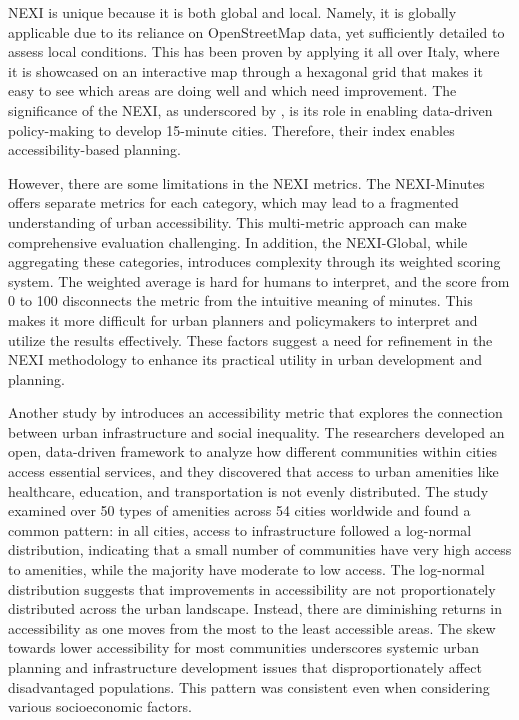 NEXI is unique because it is both global and local. 
Namely, it is globally applicable due to its reliance on OpenStreetMap data, yet sufficiently detailed to assess local conditions.
This has been proven by applying it all over Italy, where it is showcased on an interactive map through a hexagonal grid that makes it easy to see which areas are doing well and which need improvement.
The significance of the NEXI, as underscored by , is its role in enabling data-driven policy-making to develop 15-minute cities. 
Therefore, their index enables accessibility-based planning.

However, there are some limitations in the NEXI metrics. 
The NEXI-Minutes offers separate metrics for each category, which may lead to a fragmented understanding of urban accessibility. 
This multi-metric approach can make comprehensive evaluation challenging. 
In addition, the NEXI-Global, while aggregating these categories, introduces complexity through its weighted scoring system. 
The weighted average is hard for humans to interpret, and the score from 0 to 100 disconnects the metric from the intuitive meaning of minutes.
This makes it more difficult for urban planners and policymakers to interpret and utilize the results effectively. 
These factors suggest a need for refinement in the NEXI methodology to enhance its practical utility in urban development and planning.


Another study by  introduces an accessibility metric that explores the connection between urban infrastructure and social inequality. 
The researchers developed an open, data-driven framework to analyze how different communities within cities access essential services, and they discovered that access to urban amenities like healthcare, education, and transportation is not evenly distributed. 
The study examined over 50 types of amenities across 54 cities worldwide and found a common pattern: in all cities, access to infrastructure followed a log-normal distribution, indicating that a small number of communities have very high access to amenities, while the majority have moderate to low access. 
The log-normal distribution suggests that improvements in accessibility are not proportionately distributed across the urban landscape. 
Instead, there are diminishing returns in accessibility as one moves from the most to the least accessible areas. 
The skew towards lower accessibility for most communities underscores systemic urban planning and infrastructure development issues that disproportionately affect disadvantaged populations.
This pattern was consistent even when considering various socioeconomic factors.


